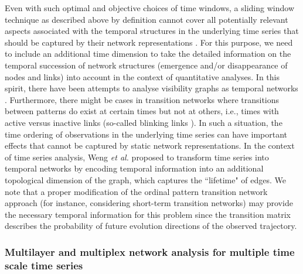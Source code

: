 Even with such optimal and objective choices of time windows, a sliding window technique as described above by definition cannot cover all potentially relevant aspects associated with the temporal structures in the underlying time series that should be captured by their network representations \cite{Holme2012}. For this purpose, we need to include an additional time dimension to take the detailed information on the temporal succession of network structures (emergence and/or disappearance of nodes and links) into account in the context of quantitative analyses. In this spirit, there have been attempts to analyse visibility graphs as temporal networks \cite{Mutua2015}. Furthermore, there might be cases in transition networks where transitions between patterns do exist at certain times but not at others, i.e., times with active versus inactive links (so-called blinking links \cite{Gozolchiani2008}). In such a situation, the time ordering of observations in the underlying time series can have important effects that cannot be captured by static network representations. In the context of time series analysis, Weng {\textit{et al.}} \cite{Weng2017} proposed to transform time series into temporal networks \cite{Holme2012} by encoding temporal information into an additional topological dimension of the graph, which captures the ``lifetime" of edges. We note that a proper modification of the ordinal pattern transition network approach (for instance, considering short-term transition networks) may provide the necessary temporal information for this problem since the transition matrix describes the probability of future evolution directions of the observed trajectory.

\subsubsection{Multilayer and multiplex network analysis for multiple time scale time series}

